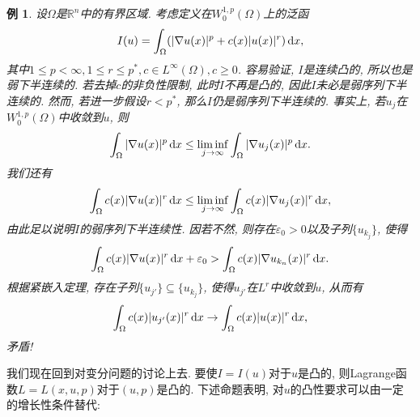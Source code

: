 \documentclass[12pt,a4paper]{article}
\newtheorem{example}[theorem]{例}
\begin{document}
\begin{example}\label{ex2.30}
    设$\Omega$是$\mathbb{R}^n$中的有界区域. 考虑定义在$W_0^{1, p}(\Omega)$上的泛函
    \begin{equation*}
        I(u) = \int_{\Omega}(|\nabla u(x)|^p + c(x)|u(x)|^r) \,{\rm d}x,
    \end{equation*}
    其中$1 \leq p < \infty, 1 \leq r \leq p^*, c \in L^{\infty}(\Omega), c \geq 0$.
    容易验证, $I$是连续凸的, 所以也是弱下半连续的. 若去掉$c$的非负性限制, 此时$I$不再是凸的, 因此$I$未必是弱序列下半连续的.
    然而, 若进一步假设$r < p^*$, 那么$I$仍是弱序列下半连续的. 事实上, 若$u_j$在$W_0^{1, p}(\Omega)$中收敛到$u$, 则 
    \begin{equation*}
        \int_{\Omega}|\nabla u(x)|^p \,{\rm d}x \leq \liminf\limits_{j \rightarrow \infty}\int_{\Omega}|\nabla u_j(x)|^p \,{\rm d}x.
    \end{equation*}
    我们还有 
    \begin{equation*}
        \int_{\Omega}c(x)|\nabla u(x)|^r \,{\rm d}x \leq \liminf\limits_{j \rightarrow \infty}\int_{\Omega}c(x)|\nabla u_j(x)|^r \,{\rm d}x,
    \end{equation*}
    由此足以说明$I$的弱序列下半连续性. 因若不然, 则存在$\varepsilon_0 > 0$以及子列$\{u_{k_j}\}$, 使得 
    \begin{equation*}
        \int_{\Omega}c(x)|\nabla u(x)|^r \,{\rm d}x + \varepsilon_0 > \int_{\Omega}c(x)|\nabla u_{k_n}(x)|^r \,{\rm d}x.
    \end{equation*}
    根据紧嵌入定理, 存在子列$\{u_{j'}\} \subseteq \{u_{k_j}\}$, 使得$u_{j'}$在$L^r$中收敛到$u$, 从而有 
    \begin{equation*}
        \int_{\Omega}c(x)|u_{j'}(x)|^r \,{\rm d}x \rightarrow \int_{\Omega}c(x)|u(x)|^r \,{\rm d}x,
    \end{equation*}
    矛盾!
\end{example}

我们现在回到对变分问题的讨论上去. 要使$I = I(u)$对于$u$是凸的, 则Lagrange函数$L = L(x, u, p)$对于$(u, p)$是凸的. 
下述命题表明, 对$u$的凸性要求可以由一定的增长性条件替代:
\end{document}
